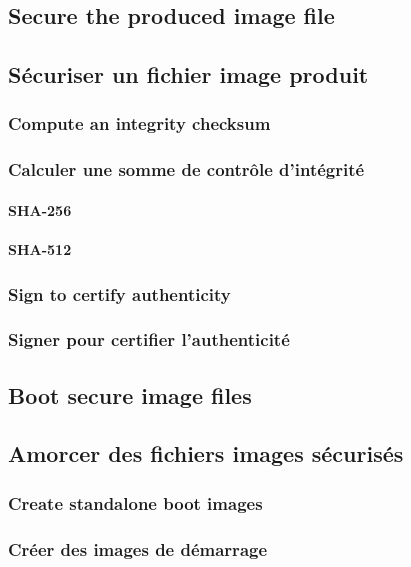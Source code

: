 \ml
{\subsection{Secure the produced image file}}
{\subsection{Sécuriser un fichier image produit}}

\ml
{\subsubsection{Compute an integrity checksum}}
{\subsubsection{Calculer une somme de contrôle d’intégrité}}

\paragraph{SHA-256}

\paragraph{SHA-512}

\ml
{\subsubsection{Sign to certify authenticity}}
{\subsubsection{Signer pour certifier l’authenticité}}

\ml
{\subsection{Boot secure image files}}
{\subsection{Amorcer des fichiers images sécurisés}}

\ml
{\subsubsection{Create standalone boot images}}
{\subsubsection{Créer des images de démarrage}}

